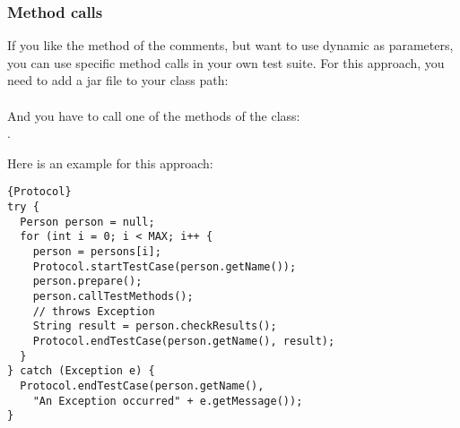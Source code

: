 \subsubsection{Method calls}
If you like the method of the comments, but want to use dynamic  as parameters, you can use specific method calls in your own test suite. For this approach, you need to add a jar file to your class path: \\
 \\
And you have to call one of the methods of the class: \\ .
\par
Here is an example for this approach:
\lstset{language=Java}
\begin{lstlisting}[caption=Example for the usage of the Protocol]{Protocol}
try {
  Person person = null;
  for (int i = 0; i < MAX; i++ {
    person = persons[i];
    Protocol.startTestCase(person.getName());
    person.prepare();
    person.callTestMethods();
    // throws Exception
    String result = person.checkResults();
    Protocol.endTestCase(person.getName(), result);
  }
} catch (Exception e) {
  Protocol.endTestCase(person.getName(),
    "An Exception occurred" + e.getMessage());
}
\end{lstlisting}
